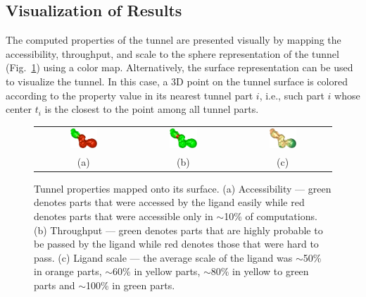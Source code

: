 \documentclass{svmult}
\newcommand{\tylde}{$\sim$}
\begin{document}
\subsection{Visualization of Results}

The computed properties of the tunnel are presented visually by mapping the accessibility, throughput, and scale to the sphere representation
of the tunnel (Fig.~\ref{fig:properties}) using a color map.
Alternatively, the surface representation can be used to visualize the tunnel.
In this case, a 3D point on the tunnel surface is colored according to the property value in its nearest tunnel part $i$,  i.e., such part $i$ whose center $t_i$ is the closest to the point among all tunnel parts.


\begin{figure}
\centering
\begin{tabular}{ccc}
\includegraphics[width=0.3\textwidth]{fig/accessibility} &
\includegraphics[width=0.3\textwidth]{fig/throughput} &
\includegraphics[width=0.3\textwidth]{fig/ligand-scale} \\
  (a) & (b) & (c) \\                     
\end{tabular}
\caption{Tunnel properties mapped onto its surface.
(a) Accessibility --- green denotes parts that were accessed by the ligand easily while red denotes parts that were accessible only in \tylde 10\% of computations.
(b) Throughput --- green denotes parts that are highly probable to be passed by the ligand while red denotes those that were hard to pass.
(c) Ligand scale --- the average scale of the ligand was \tylde 50\% in orange parts, \tylde 60\% in yellow parts, \tylde 80\% in yellow to green parts and \tylde 100\% in green parts.
\label{fig:properties}
}
\end{figure}
\end{document}

